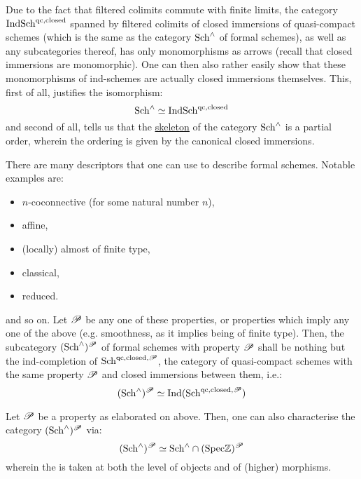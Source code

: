             \begin{remark} \label{remark: morphisms_of_formal_schemes}
                Due to the fact that filtered colimits commute with finite limits, the category $\mathrm{Ind}\mathrm{Sch}^{\mathrm{qc}, \mathrm{closed}}$ spanned by filtered colimits of closed immersions of quasi-compact schemes (which is the same as the category $\mathrm{Sch}^{\wedge}$ of formal schemes), as well as any subcategories thereof, has only monomorphisms as arrows (recall that closed immersions are monomorphic). One can then also rather easily show that these monomorphisms of ind-schemes are actually closed immersions themselves. This, first of all, justifies the isomorphism:
                    $$\mathrm{Sch}^{\wedge} \simeq \mathrm{Ind}\mathrm{Sch}^{\mathrm{qc}, \mathrm{closed}}$$
                and second of all, tells us that the \href{https://ncatlab.org/nlab/show/skeleton}{\underline{skeleton}} of the category $\mathrm{Sch}^{\wedge}$ is a partial order, wherein the ordering is given by the canonical closed immersions. 
            \end{remark}
            
            \begin{definition} \label{def: formal_schemes_descriptors}
                There are many descriptors that one can use to describe formal schemes. Notable examples are:
                    \begin{itemize}
                        \item $n$-coconnective (for some natural number $n$),
                        \item affine,
                        \item (locally) almost of finite type,
                        \item classical,
                        \item reduced.
                    \end{itemize}
                and so on. Let $\mathscr{P}$ be any one of these properties, or properties which imply any one of the above (e.g. smoothness, as it implies being of finite type). Then, the subcategory $(\mathrm{Sch}^{\wedge})^{\mathscr{P}}$ of formal schemes with property $\mathscr{P}$ shall be nothing but the ind-completion of $\mathrm{Sch}^{\mathrm{qc}, \mathrm{closed}, \mathscr{P}}$, the category of quasi-compact schemes with the same property $\mathscr{P}$ and closed immersions between them, i.e.:
                    $$(\mathrm{Sch}^{\wedge})^{\mathscr{P}} \simeq \mathrm{Ind}(\mathrm{Sch}^{\mathrm{qc}, \mathrm{closed}, \mathscr{P}})$$
            \end{definition}
            \begin{remark}
                Let $\mathscr{P}$ be a property as elaborated on above. Then, one can also characterise the category $(\mathrm{Sch}^{\wedge})^{\mathscr{P}}$ via:
                    $$(\mathrm{Sch}^{\wedge})^{\mathscr{P}} \simeq \mathrm{Sch}^{\wedge} \cap (\mathrm{Spec} \mathbb{Z})^{\mathscr{P}}$$
                wherein the  is taken at both the level of objects and of (higher) morphisms.
            \end{remark}
            
